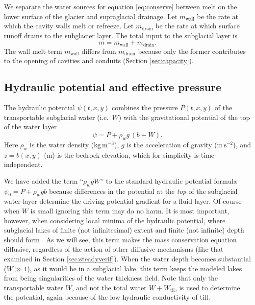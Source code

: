\documentclass[11pt,final]{amsart}
\newcommand{\Wtil}{W_{\text{til}}}
\begin{document}
We separate the water sources for equation \eqref{eq:conserve} between melt on the lower surface of the glacier and supraglacial drainage.  Let $m_{\text{wall}}$ be the rate at which the cavity walls melt or refreeze.  Let $m_{\text{drain}}$ be the rate at which surface runoff drains to the subglacier layer.  The total input to the subglacial layer is
\newcommand{\mwall}{m_{\text{wall}}}
\newcommand{\mdrain}{m_{\text{drain}}}
\begin{equation}
m = \mwall + \mdrain. \label{eq:totalinput}
\end{equation}
The wall melt term $\mwall$ differs from $\mdrain$ because only the former contributes to the opening of cavities and conduits (Section \ref{sec:capacity}).

\subsection*{Hydraulic potential and effective pressure}  The  hydraulic potential $\psi(t,x,y)$ combines the pressure $P(t,x,y)$ of the transportable subglacial water (i.e.~$W$) with the gravitational potential of the top of the water layer \citep{Goelleretal2013,Hewittetal2012}
\begin{equation} \label{eq:potential}
\psi = P + \rho_w g\, (b+W).
\end{equation}
Here $\rho_w$ is the water density ($\text{kg}\,\text{m}^{-3}$), $g$ is the acceleration of gravity ($\text{m}\,\text{s}^{-2}$), and $z=b(x,y)$ ($\text{m}$) is the bedrock elevation, which for simplicity is time-independent.

We have added the term ``$\rho_w g W$'' to the standard hydraulic potential formula $\psi_0 = P + \rho_w g b$ \citep{Clarke05,Shreve1972} because differences in the potential at the \emph{top} of the subglacial water layer determine the driving potential gradient for a fluid layer.  Of course when $W$ is small ignoring this term may do no harm.  It is most important, however, when considering local minima of the hydraulic potential, where subglacial lakes of finite (not infinitesimal) extent and finite (not infinite) depth should form \citep[compare][]{Siegertetal2009}.  As we will see, this term makes the mass conservation equation diffusive, regardless of the action of other diffusive mechanisms (like that examined in Section \ref{sec:steadyverif}).  When the water depth becomes substantial ($W\gg 1$), as it would be in a subglacial lake, this term keeps the modeled lakes from being singularities of the water thickness field.  Note that only the transportable water $W$, and not the total water $W+\Wtil$, is used to determine the potential, again because of the low hydraulic conductivity of till.
\end{document}
